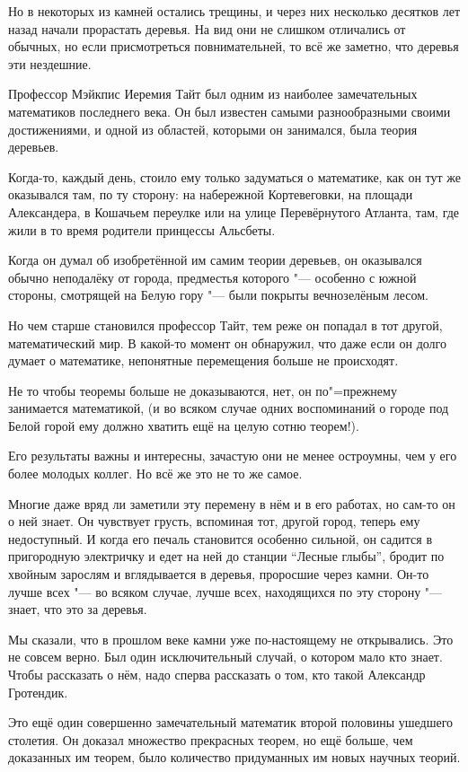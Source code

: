 Но в некоторых из камней остались трещины, и через них несколько десятков лет
назад начали прорастать деревья.
На вид они не слишком отличались от обычных, но если присмотреться
повнимательней, то всё же заметно, что деревья эти нездешние.

Профессор Мэйкпис Иеремия Тайт был одним из наиболее замечательных математиков
последнего века.
Он был известен самыми разнообразными своими достижениями, и одной из областей,
которыми он занимался, была теория деревьев.

Когда-то, каждый день, стоило ему только задуматься о математике, как он тут же
оказывался там, по ту сторону: на набережной Кортевеговки, на площади
Александера, в Кошачьем переулке или на улице Перевёрнутого Атланта, там, где
жили в то время родители принцессы Альсбеты.

Когда он думал об изобретённой им самим теории деревьев, он оказывался обычно
неподалёку от города, предместья которого "--- особенно с южной стороны,
смотрящей на Белую гору "--- были покрыты вечнозелёным лесом.

Но чем старше становился профессор Тайт, тем реже он попадал в тот другой,
математический мир.
В какой-то момент он обнаружил, что даже если он долго думает о математике,
непонятные перемещения больше не происходят.

Не то чтобы теоремы больше не доказываются, нет, он по"=прежнему занимается
математикой, (и во всяком случае одних воспоминаний о городе под Белой горой ему
должно хватить ещё на целую сотню теорем!).

Его результаты важны и интересны, зачастую они не менее остроумны, чем у его
более молодых коллег.
Но всё же это не то же самое.

Многие даже вряд ли заметили эту перемену в нём и в его работах, но сам-то он о
ней знает.
Он чувствует грусть, вспоминая тот, другой город, теперь ему недоступный.
И когда его печаль становится особенно сильной, он садится в пригородную
электричку и едет на ней до станции \enquote{Лесные глыбы}, бродит по хвойным
зарослям и вглядывается в деревья, проросшие через камни.
Он-то лучше всех "--- во всяком случае, лучше всех, находящихся по эту сторону
"--- знает, что это за деревья.

Мы сказали, что в прошлом веке камни уже по-настоящему не открывались.
Это не совсем верно.
Был один исключительный случай, о котором мало кто знает.
Чтобы рассказать о нём, надо сперва рассказать о том, кто такой Александр
Гротендик.

Это ещё один совершенно замечательный математик второй половины ушедшего
столетия.
Он доказал множество прекрасных теорем, но ещё больше, чем доказанных им теорем,
было количество придуманных им новых научных теорий.

